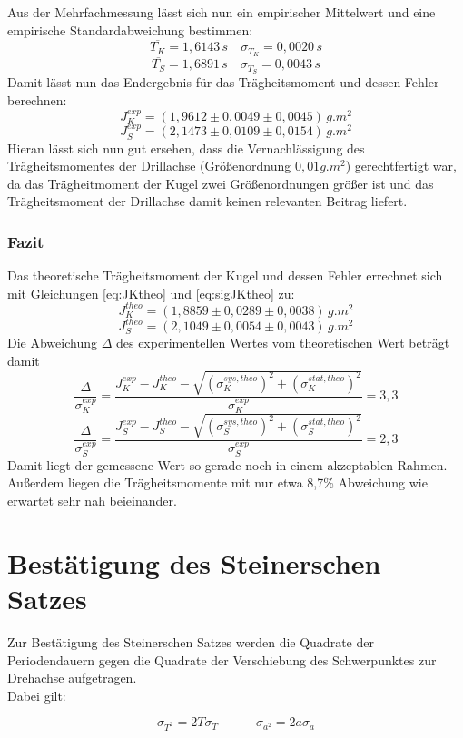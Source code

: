 \documentclass[12pt,a4paper]{article}
\begin{document}
Aus der Mehrfachmessung lässt sich nun ein empirischer Mittelwert und eine empirische Standardabweichung bestimmen:
\[\overline{T_K} = 1,6143 \,s \quad \sigma_{T_K} = 0,0020 \, s \]
\[\overline{T_S} = 1,6891 \, s \quad \sigma_{T_S} = 0,0043 \, s \]
Damit lässt nun das Endergebnis für das Trägheitsmoment und dessen Fehler berechnen:
\[J_K^{exp} = (1,9612 \pm 0,0049 \pm 0,0045) \, \si{g.m ^2} \]
\[J_S^{exp} = (2,1473 \pm 0,0109 \pm 0,0154) \, \si{g.m ^2} \]
Hieran lässt sich nun gut ersehen, dass die Vernachlässigung des Trägheitsmomentes der Drillachse (Größenordnung $0,01\si{g.m ^2}$) gerechtfertigt war, da das Trägheitmoment der Kugel zwei Größenordnungen größer ist und das Trägheitsmoment der Drillachse damit keinen relevanten Beitrag liefert.

\subsubsection{Fazit}
Das theoretische Trägheitsmoment der Kugel und dessen Fehler errechnet sich mit Gleichungen \ref{eq:JKtheo} und \ref{eq:sigJKtheo} zu:
\[J_K^{theo} = (1,8859 \pm 0,0289 \pm 0,0038) \, \si{g.m ^2} \]
\[J_S^{theo} = (2,1049 \pm 0,0054 \pm 0,0043) \, \si{g.m ^2} \]
Die Abweichung $\Delta$ des experimentellen Wertes vom theoretischen Wert beträgt damit 
\[\dfrac{\Delta}{\sigma _K^{exp}} = \dfrac{J_K^{exp} - J_K^{theo} - \sqrt{\left( \sigma _K^{sys,theo}\right) ^2 + \left( \sigma _K^{stat,theo}\right) ^2}}{\sigma _K^{exp}} = 3,3 \]
\[\dfrac{\Delta}{\sigma _S^{exp}} = \dfrac{J_S^{exp} - J_S^{theo} - \sqrt{\left( \sigma _S^{sys,theo}\right) ^2 + \left( \sigma _S^{stat,theo}\right) ^2}}{\sigma _S^{exp}} = 2,3 \]
Damit liegt der gemessene Wert so gerade noch in einem akzeptablen Rahmen. \\
Außerdem liegen die Trägheitsmomente mit nur etwa 8,7\% Abweichung wie erwartet sehr nah beieinander.




\section{Bestätigung des Steinerschen Satzes}

Zur Bestätigung des Steinerschen Satzes werden die Quadrate der Periodendauern gegen die Quadrate der Verschiebung des Schwerpunktes zur 
Drehachse aufgetragen.\\
Dabei gilt:

\begin{equation}
\sigma_{T^2}=2 T \sigma_T \quad \quad \quad
\sigma_{a^2}=2a \sigma_a
\end{equation}
\end{document}

